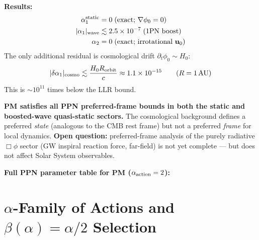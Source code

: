 \documentclass[10pt,twocolumn]{article}
\begin{document}
\textbf{Results:}
\begin{align*}
  \alpha_1^{\rm static} &= 0 \;\text{(exact; $\nabla\phi_0=0$)} \\
  |\alpha_1|_{\rm wave} &\lesssim 2.5\times10^{-7} \;\text{(1PN boost)} \\
  \alpha_2 &= 0 \;\text{(exact; irrotational $\mathbf{u}_0$)}
\end{align*}
The only additional residual is cosmological drift $\partial_t\phi_0 \sim H_0$:
\[
  |\delta\alpha_1|_{\rm cosmo} \lesssim \frac{H_0 R_{\rm orbit}}{c}
  \approx 1.1\times 10^{-15} \qquad (R=1\,\text{AU})
\]
This is $\sim 10^{11}$ times below the LLR bound.

\textbf{PM satisfies all PPN preferred-frame bounds in both the static and
boosted-wave quasi-static sectors.}  The cosmological background defines a
preferred \emph{state} (analogous to the CMB rest frame) but not a preferred
\emph{frame} for local dynamics.  \textbf{Open question:} preferred-frame
analysis of the purely radiative $\Box\phi$ sector (GW inspiral reaction force,
far-field) is not yet complete — but does not affect Solar System observables.

\textbf{Full PPN parameter table for PM ($\alpha_{\rm action}=2$):}
\begin{center}
\end{center}

\section{$\alpha$-Family of Actions and $\beta(\alpha)=\alpha/2$ Selection}
\end{document}
